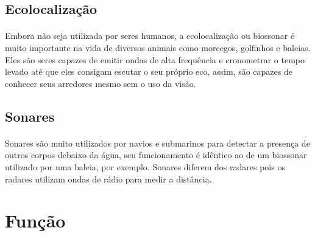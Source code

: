     \subsection*{Ecolocalização}
    \paragraph{}
        Embora não seja utilizada por seres humanos, a ecolocalização ou biossonar é muito importante na vida de diversos animais como morcegos, golfinhos e baleias. Eles são seres capazes de emitir ondas de alta frequência e cronometrar o tempo levado até que eles consigam escutar o seu próprio eco, assim, são capazes de conhecer seus arredores mesmo sem o uso da visão.
        
    \subsection*{Sonares}
    \paragraph{}
        Sonares são muito utilizados por navios e submarinos para detectar a presença de outros corpos debaixo da água, seu funcionamento é idêntico ao de um biossonar utilizado por uma baleia, por exemplo. Sonares diferem dos radares pois os radares utilizam ondas de rádio para medir a distância.
        
\section*{Função}

